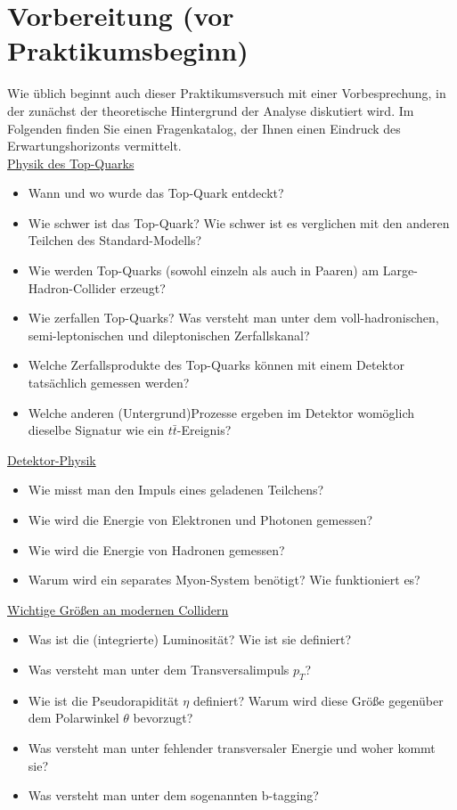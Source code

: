 \section{Vorbereitung (vor Praktikumsbeginn)}
\label{tasks}
Wie \"ublich beginnt auch dieser Praktikumsversuch mit einer Vorbesprechung, in der zun\"achst der theoretische Hintergrund der Analyse diskutiert wird. Im Folgenden finden Sie einen Fragenkatalog, der Ihnen einen Eindruck des Erwartungshorizonts vermittelt.\\
\underline{Physik des Top-Quarks}
\begin{itemize}
	\item Wann und wo wurde das Top-Quark entdeckt?
	\item Wie schwer ist das Top-Quark? Wie schwer ist es verglichen mit den anderen Teilchen des Standard-Modells?
	\item Wie werden Top-Quarks (sowohl einzeln als auch in Paaren) am Large-Hadron-Collider erzeugt?
	\item Wie zerfallen Top-Quarks? Was versteht man unter dem voll-hadronischen, semi-leptonischen und dileptonischen Zerfallskanal?
	\item Welche Zerfallsprodukte des Top-Quarks k\"onnen mit einem Detektor tats\"achlich gemessen werden?
	\item Welche anderen (Untergrund)Prozesse ergeben im Detektor wom\"oglich dieselbe Signatur wie ein $t\bar{t}$-Ereignis?
\end{itemize}
\underline{Detektor-Physik}
\begin{itemize}
	\item Wie misst man den Impuls eines geladenen Teilchens?
	\item Wie wird die Energie von Elektronen und Photonen gemessen?
	\item Wie wird die Energie von Hadronen gemessen?
	\item Warum wird ein separates Myon-System ben\"otigt? Wie funktioniert es?
\end{itemize}
\underline{Wichtige Gr\"o\ss{}en an modernen Collidern}
\begin{itemize}
	\item Was ist die (integrierte) Luminosit\"at? Wie ist sie definiert?
	\item Was versteht man unter dem Transversalimpuls $p_{T}$?
	\item Wie ist die Pseudorapidit\"at $\eta$ definiert? Warum wird diese Gr\"o\ss{}e gegen\"uber dem Polarwinkel $\theta$ bevorzugt?
	\item Was versteht man unter fehlender transversaler Energie und woher kommt sie?
	\item Was versteht man unter dem sogenannten b-tagging?
\end{itemize}
